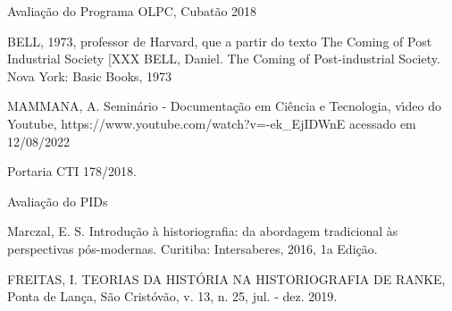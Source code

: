 \documentclass[
12pt,		%
openright,	%
twoside,  %
a4paper,			%
chapter=TITLE,		%
english,			%
french,				%
spanish,			%
brazil				%
]{USPSC-classe/USPSC}
\begin{document}
\begin{flushleft}
\begin{flushleft}
 Avalia\c{c}\~ao do Programa OLPC, Cubat\~ao 2018
\end{flushleft}


\end{flushleft}


\begin{flushleft}
\begin{flushleft}
[BELL, 1973]  BELL, 1973, professor de Harvard, que a partir do texto The Coming of Post Industrial Society [XXX BELL, Daniel. The Coming of Post-industrial Society. Nova York: Basic Books, 1973
\end{flushleft}


\end{flushleft}


\begin{flushleft}
\begin{flushleft}
[MAMMANA, 2020] MAMMANA, A. Semin\'ario - Documenta\c{c}\~ao em Ci\^encia e Tecnologia, v\'{\i}deo do Youtube, https://www.youtube.com/watch?v=-ek\_EjIDWnE acessado em 12/08/2022
\end{flushleft}


\end{flushleft}


\begin{flushleft}
\begin{flushleft}
[CTI, 2018] Portaria CTI 178/2018.
\end{flushleft}


\end{flushleft}


\begin{flushleft}
\begin{flushleft}
[MAMMANA, 2009] Avalia\c{c}\~ao do PIDs
\end{flushleft}


\end{flushleft}


\begin{flushleft}
\begin{flushleft}
[Marczal, 2016] Marczal, E. S. Introdu\c{c}\~ao \`a historiografia: da abordagem tradicional \`as perspectivas p\'os-modernas. Curitiba: Intersaberes, 2016, 1a Edi\c{c}\~ao.
\end{flushleft}


\end{flushleft}


\begin{flushleft}
\begin{flushleft}
[FREITAS, 2019] FREITAS, I. TEORIAS DA HIST\'ORIA NA HISTORIOGRAFIA DE RANKE, Ponta de Lan\c{c}a, S\~ao Crist\'ov\~ao, v. 13, n. 25, jul. - dez. 2019.
\end{flushleft}


\end{flushleft}
\end{document}
